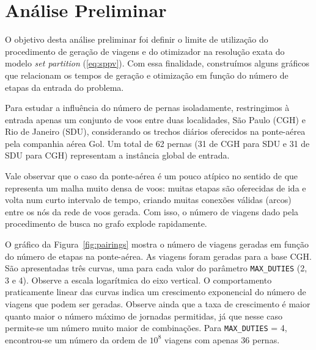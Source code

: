 
\section{Análise Preliminar}
\label{sec:preliminar}

O objetivo desta análise preliminar foi definir o limite de utilização do procedimento de geração
de viagens e do otimizador na resolução exata do modelo {\it set partition} (\ref{eq:sppv}).
Com essa finalidade, construímos alguns gráficos que relacionam os tempos de geração e otimização em
função do número de etapas da entrada do problema.

Para estudar a influência do número de pernas isoladamente, restringimos à entrada apenas um
conjunto de voos entre duas localidades, São Paulo (CGH) e Rio de Janeiro (SDU), considerando os
trechos diários oferecidos na ponte-aérea pela companhia aérea Gol. Um total de 62 pernas 
(31 de CGH para SDU e 31 de SDU para CGH) representam a instância global de entrada.

Vale observar que o caso da ponte-aérea é um pouco atípico no sentido de que representa um malha 
muito densa de voos: muitas etapas são oferecidas de ida e volta num curto intervalo de tempo, 
criando muitas conexões válidas (arcos) entre os nós da rede de voos gerada. Com isso, o número
de viagens dado pela procedimento de busca no grafo explode rapidamente.

O gráfico da Figura~\ref{fig:pairings} mostra o número de viagens geradas em função do número de
etapas na ponte-aérea. As viagens foram geradas para a base CGH. São apresentadas três curvas, uma
para cada valor do parâmetro \verb|MAX_DUTIES| (2, 3 e 4). Observe a escala logarítmica do eixo
vertical. O comportamento praticamente linear das curvas indica um crescimento exponencial do número
de viagens que podem ser geradas. Observe ainda que a taxa de crescimento é maior quanto maior o
número máximo de jornadas permitidas, já que nesse caso permite-se um número muito maior de
combinações. Para \verb|MAX_DUTIES| = 4, encontrou-se um número da ordem de $10^8$ viagens com
apenas 36 pernas.

